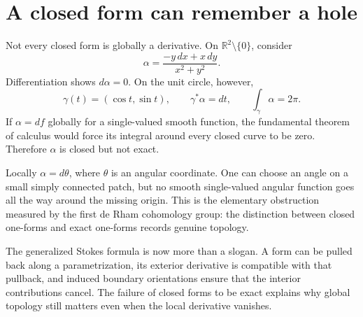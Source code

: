 \section{A closed form can remember a hole}

Not every closed form is globally a derivative. On \(\mathbb R^2\setminus\{0\}\), consider
\[
 \alpha=\frac{-y\,dx+x\,dy}{x^2+y^2}.
\]
Differentiation shows \(d\alpha=0\). On the unit circle, however,
\[
 \gamma(t)=(\cos t,\sin t),\qquad
 \gamma^*\alpha=dt,\qquad
 \int_\gamma\alpha=2\pi.
\]
If \(\alpha=df\) globally for a single-valued smooth function, the fundamental theorem of calculus would force its integral around every closed curve to be zero. Therefore \(\alpha\) is closed but not exact.

Locally \(\alpha=d\theta\), where \(\theta\) is an angular coordinate. One can choose an angle on a small simply connected patch, but no smooth single-valued angular function goes all the way around the missing origin. This is the elementary obstruction measured by the first de Rham cohomology group: the distinction between closed one-forms and exact one-forms records genuine topology.

The generalized Stokes formula is now more than a slogan. A form can be pulled back along a parametrization, its exterior derivative is compatible with that pullback, and induced boundary orientations ensure that the interior contributions cancel. The failure of closed forms to be exact explains why global topology still matters even when the local derivative vanishes.
